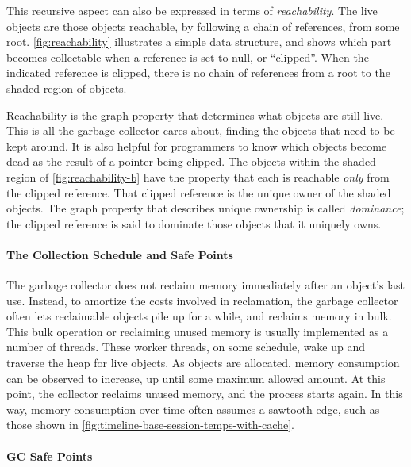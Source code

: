 This recursive aspect can also be expressed in terms of \emph{reachability}.
 The live objects are those objects reachable, by following a
chain of references, from some root. \autoref{fig:reachability} illustrates a
simple data structure, and shows which part becomes collectable when a reference
is set to null, or ``clipped''. When the indicated reference is clipped, there is
no chain of references from a root to the shaded region of objects.

Reachability is the graph property that determines what objects are still live.
This is all the garbage collector cares about, finding the objects that need to
be kept around. It is also helpful for programmers to know which objects become
dead as the result of a pointer being clipped. The objects within the shaded
region of \autoref{fig:reachability-b} have the property that each is reachable
\emph{only} from the clipped reference. That clipped reference is the unique
owner of the shaded objects. The graph property that describes unique ownership
is called \emph{dominance};  the clipped reference is said to
dominate those objects that it uniquely owns.

\paragraph{The Collection Schedule and Safe Points}
The garbage collector does not reclaim memory immediately after an object's last
use. Instead, to amortize the costs involved in reclamation, the garbage
collector often lets reclaimable objects pile up for a while, and reclaims memory
in bulk. This bulk operation or reclaiming unused memory is usually implemented
as a number of threads. These worker threads, on some schedule, wake up and
traverse the heap for live objects. As objects are allocated, memory consumption
can be observed to increase, up until some maximum allowed amount. At this point,
the collector reclaims unused memory, and the process starts again. In this way,
memory consumption over time often assumes a sawtooth edge, such as those shown
in \autoref{fig:timeline-base-session-temps-with-cache}.

\paragraph{GC Safe Points}


